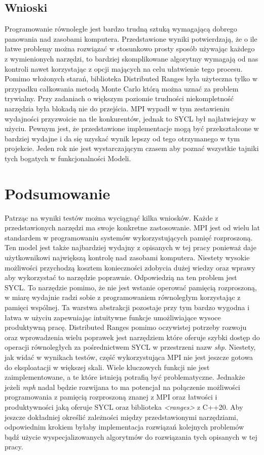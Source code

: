\documentclass[a4paper,12pt]{book} %
\begin{document}
\section{Wnioski}
Programowanie równoległe jest bardzo trudną sztuką wymagającą dobrego panowania nad zasobami komputera. Przedstawione wyniki potwierdzają, że o ile łatwe problemy można rozwiązać w stosunkowo prosty sposób używając każdego z wymienionych narzędzi, to bardziej skomplikowane algorytmy wymagają od nas kontroli nawet korzystając z opcji mających na celu ułatwienie tego procesu. Pomimo włożonych starań, biblioteka Distributed Ranges była użyteczna tylko w przypadku całkowania metodą Monte Carlo którą można uznać za problem trywialny. Przy zadaniach o większym poziomie trudności niekompletność narzędzia była blokadą nie do przejścia. MPI wypadł w tym zestawieniu wydajności przyzwoicie na tle konkurentów, jednak to SYCL był najłatwiejszy w użyciu. Pewnym jest, że przedstawione implementacje mogą być przekształcone w bardziej wydajne i da się uzyskać wynik lepszy od tego otrzymanego w tym projekcie. Jeden rok nie jest wystarczającym czasem aby poznać wszystkie tajniki tych bogatych w funkcjonalności Modeli. 


\chapter*{Podsumowanie}
Patrząc na wyniki testów można wyciągnąć kilka wniosków. Każde z przedstawionych narzędzi ma swoje konkretne zastosowanie. MPI jest od wielu lat standardem w programowaniu systemów wykorzystujących pamięć rozproszoną. Ten model jest także najbardziej wydajny z opisanych w tej pracy ponieważ daje użytkownikowi największą kontrolę nad zasobami komputera. Niestety wysokie możliwości przychodzą kosztem konieczności zdobycia dużej wiedzy oraz wprawy aby wykorzystać to narzędzie poprawnie. Odpowiedzią na ten problem jest SYCL. To narzędzie pomimo, że nie jest wstanie operować pamięcią rozproszoną, w miarę wydajnie radzi sobie z programowaniem równoległym korzystając z pamięci wspólnej. Ta warstwa abstrakcji pozostaje przy tym bardzo wygodna i łatwa w użyciu zapewniając intuitywne funkcje umożliwiające wysoce produktywną pracę. Distributed Ranges pomimo oczywistej potrzeby rozwoju oraz wprowadzenia wielu poprawek jest narzędziem które oferuje szybki dostęp do operacji równoległych za pośrednictwem SYCL w przestrzeni nazw \emph{shp}. Niestety, jak widać w wynikach testów, część wykorzystująca MPI nie jest jeszcze gotowa do eksploatacji w większej skali. Wiele kluczowych funkcji nie jest zaimplementowane, a te które istnieją potrafią być problematyczne. Jednakże jeżeli \emph{mph} nadal będzie rozwijana to ma potencjał na połączenie możliwości programowania z pamięcią rozproszoną znanej z MPI oraz łatwości i produktywności jaką oferuje SYCL oraz biblioteka \emph{<ranges>} z C++20. Aby jeszcze dokładniej określić zależności między przedstawionymi narzędziami, odpowiednim krokiem byłaby implementacja rozwiązań kolejnych problemów bądź użycie wyspecjalizowanych algorytmów do rozwiązania tych opisanych w tej pracy.



\listoftables{} %

\listoffigures{} %

\printbibliography
\end{document}

